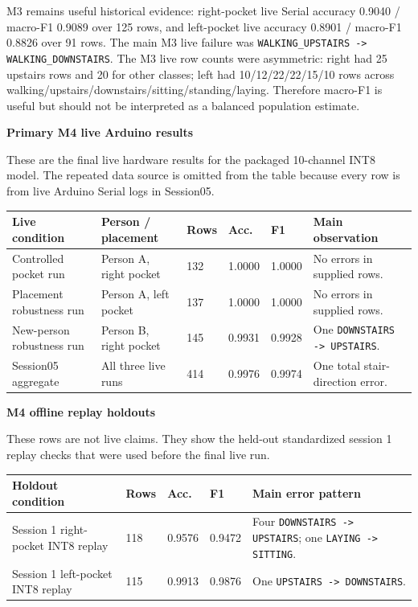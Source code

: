 \documentclass[11pt,a4paper]{article}
\begin{document}
M3 remains useful historical evidence: right-pocket live Serial accuracy 0.9040 / macro-F1 0.9089 over 125 rows, and left-pocket live accuracy 0.8901 / macro-F1 0.8826 over 91 rows. The main M3 live failure was \texttt{WALKING\_UPSTAIRS -> WALKING\_DOWNSTAIRS}. The M3 live row counts were asymmetric: right had 25 upstairs rows and 20 for other classes; left had 10/12/22/22/15/10 rows across walking/upstairs/downstairs/sitting/standing/laying. Therefore macro-F1 is useful but should not be interpreted as a balanced population estimate.

\textbf{Primary M4 live Arduino results}

These are the final live hardware results for the packaged 10-channel INT8 model. The repeated data source is omitted from the table because every row is from live Arduino Serial logs in Session05.

\begin{center}
\small
\begin{tabular}{|p{3.4cm}|p{2.8cm}|p{0.9cm}|p{1.1cm}|p{1.1cm}|p{3.8cm}|}
\hline
\rowcolor{headergray}
\textbf{Live condition} & \textbf{Person / placement} & \textbf{Rows} & \textbf{Acc.} & \textbf{F1} & \textbf{Main observation}\\
\hline
Controlled pocket run & Person A, right pocket & 132 & 1.0000 & 1.0000 & No errors in supplied rows.\\
\hline
Placement robustness run & Person A, left pocket & 137 & 1.0000 & 1.0000 & No errors in supplied rows.\\
\hline
New-person robustness run & Person B, right pocket & 145 & 0.9931 & 0.9928 & One \texttt{DOWNSTAIRS -> UPSTAIRS}.\\
\hline
\rowcolor{softblue}
Session05 aggregate & All three live runs & 414 & 0.9976 & 0.9974 & One total stair-direction error.\\
\hline
\end{tabular}
\end{center}
\normalsize

\textbf{M4 offline replay holdouts}

These rows are not live claims. They show the held-out standardized session 1 replay checks that were used before the final live run.

\begin{center}
\small
\begin{tabular}{|p{4.2cm}|p{1.0cm}|p{1.2cm}|p{1.2cm}|p{5.1cm}|}
\hline
\rowcolor{headergray}
\textbf{Holdout condition} & \textbf{Rows} & \textbf{Acc.} & \textbf{F1} & \textbf{Main error pattern}\\
\hline
Session 1 right-pocket INT8 replay & 118 & 0.9576 & 0.9472 & Four \texttt{DOWNSTAIRS -> UPSTAIRS}; one \texttt{LAYING -> SITTING}.\\
\hline
Session 1 left-pocket INT8 replay & 115 & 0.9913 & 0.9876 & One \texttt{UPSTAIRS -> DOWNSTAIRS}.\\
\hline
\end{tabular}
\end{center}
\normalsize
\end{document}
